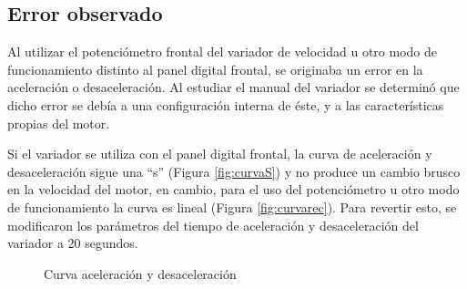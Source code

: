 \subsection{Error observado}\label{sec:error}
Al utilizar el potenciómetro frontal del variador de velocidad u otro modo de funcionamiento distinto al panel digital frontal, se originaba un error en la aceleración o desaceleración.  Al estudiar el manual del variador se determinó que dicho error se debía a una configuración interna de éste, y a las características propias del motor.


Si el variador se utiliza con el panel digital frontal, la curva de aceleración y desaceleración
sigue una “s” (Figura \ref{fig:curvaS}) y no produce un cambio brusco en la velocidad del motor, en cambio, para
el uso del potenciómetro u otro modo de funcionamiento la curva es lineal (Figura \ref{fig:curvarec}). Para revertir
esto, se modificaron los parámetros del tiempo de aceleración y desaceleración del variador a 20 segundos.  


\begin{figure}[H]
	\centering
	\caption{Curva aceleración y desaceleración} \label{fig:curva}
\end{figure}



